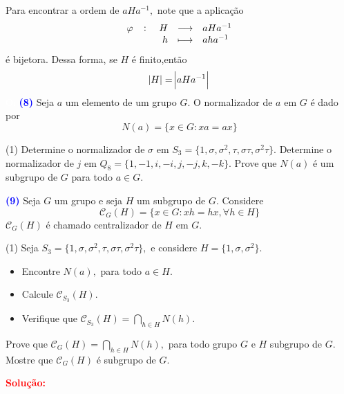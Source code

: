 \documentclass[12pt, a4paper]{article}
\newcommand{\negrito}[1]{\mbox{\boldmath{$#1$}}}
\begin{document}
Para encontrar a ordem de $aHa^{-1},$ note que a aplicação
\[
\fullfunction{\varphi}{H}{aHa^{-1}}{h}{aha^{-1}}
\]
é bijetora. Dessa forma, se $H$ é finito,então
\[
\abs{H} = \abs{aHa^{-1}}
\]
\textcolor{white}{Oi}\newline\newline
\textcolor{blue}{\bf(8)}\label{16} Seja $a$ um elemento de um grupo $G.$ O normalizador de $a$ em $G$ é dado por
\[
N(a) = \{ x \in G : xa = ax \}
\]
\begin{tasks}[counter-format={(tsk[a])},label-width=3.6ex, label-format = {\bfseries}, column-sep = {0pt}](1)
\task[\textcolor{Floresta}{$\negrito{(a)} $}] Determine o normalizador de $\sigma$ em $S_3 = \{1, \sigma, \sigma^2, \tau, \sigma \tau, \sigma^2 \tau \}.$
\task[\textcolor{Floresta}{$\negrito{(b)} $}] Determine o normalizador de $j$ em $Q_8 = \{1, -1, i, -i, j, -j, k,-k \}.$
\task[\textcolor{Floresta}{$\negrito{(c)} $}] Prove que $N(a)$ é um subgrupo de $G$ para todo $a \in G.$
\end{tasks}
\textcolor{blue}{\bf(9)}\label{17} Seja $G$ um grupo e seja $H$ um subgrupo de $G.$ Considere
\[
\mathcal{C}_G(H) = \{x \in G : xh = hx, \forall h \in H \}
\]
$\mathcal{C}_G(H)$ é chamado centralizador de $H$ em $G.$
\begin{tasks}[counter-format={(tsk[a])},label-width=3.6ex, label-format = {\bfseries}, column-sep = {0pt}](1)
\task[\textcolor{Floresta}{$\negrito{(a)} $}] Seja $S_3 = \{1, \sigma, \sigma^2, \tau, \sigma \tau, \sigma^2 \tau \},$ e considere $H = \{1, \sigma, \sigma^2 \}.$ 
\begin{itemize}
\item Encontre $N(a),$ para todo $a \in H.$
\item Calcule $\mathcal{C}_{S_3}(H).$
\item Verifique que $\mathcal{C}_{S_3}(H) = \bigcap\limits_{h \in H} N(h).$
\end{itemize}
\task[\textcolor{Floresta}{$\negrito{(b)} $}] Prove que $\mathcal{C}_{G}(H) = \bigcap\limits_{h \in H} N(h),$ para todo grupo $G$ e $H$ subgrupo de $G.$
\task[\textcolor{Floresta}{$\negrito{(c)} $}] Mostre que $\mathcal{C}_G(H)$ é subgrupo de $G.$
\end{tasks}
\textbf{\textcolor{red}{Solução:}}
\end{document}
